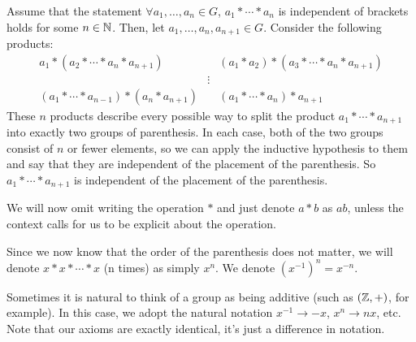 \documentclass[10pt, oneside]{article}
\begin{document}
{\begin{enumerate}
    Assume that the statement $\forall a_1, \dots, a_n\in G$, $a_1* \cdots * a_n$ is independent of brackets holds for some $n\in \mathbb{N}$. Then, let $a_1, \dots, a_n, a_{n+1}\in G$. Consider the following products:
    \begin{align*}
        a_1 * (a_2 * \cdots * a_n * a_{n+1}) &\quad (a_1*a_2)*(a_3 * \cdots * a_n*a_{n+1}) \\
        &\vdots \\
        (a_1*\cdots * a_{n-1})*(a_{n}*a_{n+1}) &\quad (a_1*\cdots * a_n) * a_{n+1}
    \end{align*}
    These $n$ products describe every possible way to split the product $a_1 * \cdots * a_{n+1}$ into exactly two groups of parenthesis. In each case, both of the two groups consist of $n$ or fewer elements, so we can apply the inductive hypothesis to them and say that they are independent of the placement of the parenthesis. So $a_1 * \cdots * a_{n+1}$ is independent of the placement of the parenthesis.
\end{enumerate}
}   

We will now omit writing the operation $*$ and just denote $a*b$ as $ab$, unless the context calls for us to be explicit about the operation. 

Since we now know that the order of the parenthesis does not matter, we will denote $x*x*\cdots*x$ (n times) as simply $x^n$. We denote $(x^{-1})^n = x^{-n}$.

Sometimes it is natural to think of a group as being additive (such as $(\mathbb{Z},+)$, for example). In this case, we adopt the natural notation $x^{-1}\to -x$, $x^n\to nx$, etc. Note that our axioms are exactly identical, it's just a difference in notation.
\end{document}
